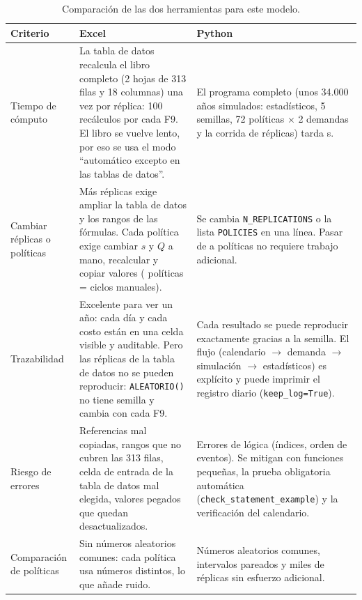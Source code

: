 \begin{table}[H]
\centering
\caption{Comparación de las dos herramientas para este modelo.}
\label{tab:B5}
\small
\begin{tabularx}{\textwidth}{>{\raggedright\arraybackslash}p{2.6cm}>{\raggedright\arraybackslash}X>{\raggedright\arraybackslash}X}
\toprule
Criterio & Excel & Python \\
\midrule
Tiempo de cómputo &
La tabla de datos recalcula el libro completo (2 hojas de 313 filas y 18 columnas) una vez por
réplica: 100 recálculos por cada F9. El libro se vuelve lento, por eso se usa el modo
``automático excepto en las tablas de datos''. &
El programa completo (unos 34.000 años simulados: estadísticos, 5 semillas, 72 políticas
$\times$ 2 demandas y la corrida de \repsPrecision{} réplicas) tarda \tiempoPython{} s. \\
\addlinespace
Cambiar réplicas o políticas &
Más réplicas exige ampliar la tabla de datos y los rangos de las fórmulas. Cada política exige
cambiar $s$ y $Q$ a mano, recalcular y copiar valores (\nPoliticasXl{} políticas = \nPoliticasXl{} ciclos manuales). &
Se cambia \texttt{N\_REPLICATIONS} o la lista \texttt{POLICIES} en una línea. Pasar de \nPoliticasXl{} a \nPoliticasPy{}
políticas no requiere trabajo adicional. \\
\addlinespace
Trazabilidad &
Excelente para ver un año: cada día y cada costo están en una celda visible y auditable. Pero las
réplicas de la tabla de datos no se pueden reproducir: \texttt{ALEATORIO()} no tiene semilla y
cambia con cada F9. &
Cada resultado se puede reproducir exactamente gracias a la semilla. El flujo
(calendario $\to$ demanda $\to$ simulación $\to$ estadísticos) es explícito y puede imprimir el
registro diario (\texttt{keep\_log=True}). \\
\addlinespace
Riesgo de errores &
Referencias mal copiadas, rangos que no cubren las 313 filas, celda de entrada de la tabla de datos
mal elegida, valores pegados que quedan desactualizados. &
Errores de lógica (índices, orden de eventos). Se mitigan con funciones pequeñas, la prueba
obligatoria automática (\texttt{check\_statement\_example}) y la verificación del calendario. \\
\addlinespace
Comparación de políticas &
Sin números aleatorios comunes: cada política usa números distintos, lo que añade ruido. &
Números aleatorios comunes, intervalos pareados y miles de réplicas sin esfuerzo adicional. \\
\bottomrule
\end{tabularx}
\end{table}

